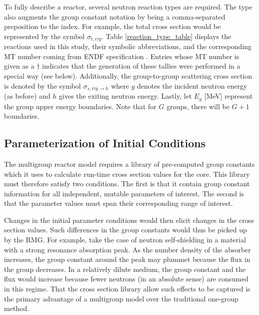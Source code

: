 To fully describe a reactor, several neutron reaction types are required.  The type 
also augments the group constant notation by being a comma-separated preposition to 
the index.  For example, the total cross section would be represented by the symbol 
$\sigma_{t,i\tau g}$. Table \ref{reaction_type_table} displays the reactions used in this 
study, their symbolic abbreviations, and the corresponding MT number coming from ENDF 
specification \cite{MFMT}.  Entries whose MT number is given as a $\dagger$ indicates 
that the generation of these tallies were performed in a special way (see below).
Additionally, the group-to-group scattering cross section is denoted by the symbol
$\sigma_{s,i\tau g\to h}$ where $g$ denotes the incident neutron energy (as before) and $h$
gives the exiting neutron energy.  Lastly, let $E_g$ [MeV] represent the group 
upper energy boundaries.  Note that for $G$ groups, there will be $G+1$ boundaries.

\subsection{Parameterization of Initial Conditions}
\label{mg_sec:param_ic}
The multigroup reactor model requires a library of pre-computed group constants which it uses
to calculate run-time cross section values for the core.  This library must therefore satisfy 
two conditions.  The first is that it contain group constant information for all independent, 
mutable parameters of interest.  The second is that the parameter values must span 
their corresponding range of interest.  

Changes in the initial parameter conditions would then elicit changes in the cross section 
values. Such differences in the group constants would thus be picked up by the RMG.  For example, 
take the case of neutron self-shielding in a material with a strong resonance absorption peak.  
As the number density of the absorber increases, the group constant around 
the peak may plummet because the flux in the group decreases.  In a relatively dilute medium, the group 
constant and the flux would increase because fewer neutrons (in an absolute sense) are consumed 
in this regime.  That the  cross section library allow such effects to be captured is the primary advantage 
of a multigroup model over the traditional one-group method.

